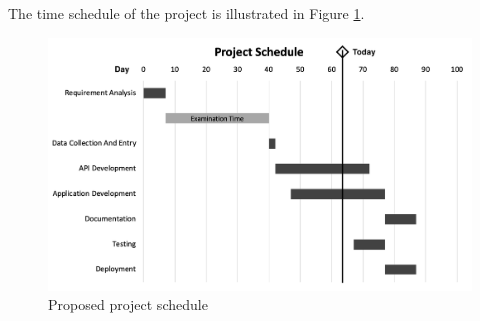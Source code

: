 \documentclass[12pt, a4paper, oneside]{article}
\begin{document}
The time schedule of the project is illustrated in Figure \ref{fig:schedule}.

\begin{figure}[h!]
	\includegraphics[width=\linewidth]{schedule}
	\centering
	\caption{Proposed project schedule}
	\label{fig:schedule}
\end{figure}



\break
{}


\end{document}
